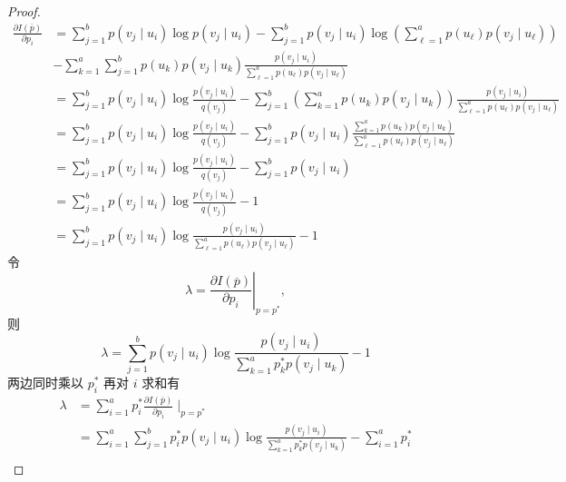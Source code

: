\begin{proof}
$$ \begin{aligned} \frac{\partial I(\bar{p})}{\partial p_{i}}&= \sum_{j=1}^{b} p\left(v_{j} \mid u_{i}\right) \log p\left(v_{j} \mid u_{i}\right)-\sum_{j=1}^{b} p\left(v_{j} \mid u_{i}\right) \log \left(\sum_{\ell=1}^{a} p\left(u_{\ell}\right) p\left(v_{j} \mid u_{\ell}\right)\right) \\ &-\sum_{k=1}^{a} \sum_{j=1}^{b} p\left(u_{k}\right) p\left(v_{j} \mid u_{k}\right) \frac{p\left(v_{j} \mid u_{i}\right)}{\sum\limits_{\ell=1}^{a} p\left(u_{\ell}\right) p\left(v_{j} \mid u_{\ell}\right)} \\ &=\sum_{j=1}^{b} p\left(v_{j} \mid u_{i}\right) \log \frac{p\left(v_{j} \mid u_{i}\right)}{q\left(v_{j}\right)}-\sum_{j=1}^{b}\left(\sum_{k=1}^{a} p\left(u_{k}\right) p\left(v_{j} \mid u_{k}\right)\right) \frac{p\left(v_{j} \mid u_{i}\right)}{\sum\limits_{\ell=1}^{a} p\left(u_{\ell}\right) p\left(v_{j} \mid u_{\ell}\right)} \\ &=\sum_{j=1}^{b} p\left(v_{j} \mid u_{i}\right) \log \frac{p\left(v_{j} \mid u_{i}\right)}{q\left(v_{j}\right)}-\sum_{j=1}^{b} p\left(v_{j} \mid u_{i}\right) \frac{\sum\limits_{k=1}^{a} p\left(u_{k}\right) p\left(v_{j} \mid u_{k}\right)}{\sum\limits_{\ell=1}^{a} p\left(u_{\ell}\right) p\left(v_{j} \mid u_{\ell}\right)} \\ &=\sum_{j=1}^{b} p\left(v_{j} \mid u_{i}\right) \log \frac{p\left(v_{j} \mid u_{i}\right)}{q\left(v_{j}\right)}-\sum_{j=1}^{b} p\left(v_{j} \mid u_{i}\right) \\ &=\sum_{j=1}^{b} p\left(v_{j} \mid u_{i}\right) \log \frac{p\left(v_{j} \mid u_{i}\right)}{q\left(v_{j}\right)}-1\\
&=\sum_{j=1}^{b} p\left(v_{j} \mid u_{i}\right) \log \frac{p\left(v_{j} \mid u_{i}\right)}{\sum\limits_{\ell=1}^{a} p\left(u_{\ell}\right) p\left(v_{j} \mid u_{\ell}\right)}-1
\end{aligned} $$
令
$$
\lambda=\left.\frac{\partial I(\overline{p})}{\partial p_{i}}\right|_{p=p^{*}},
$$
则
$$
\lambda=\sum_{j=1}^{b} p\left(v_{j} \mid u_{i}\right) \log \frac{p\left(v_{j} \mid u_{i}\right)}{\sum\limits_{k=1}^{a} p_{k}^{*} p\left(v_{j} \mid u_{k}\right)}-1
$$
两边同时乘以 $ p_{i}^{*} $ 再对 $ i $ 求和有
$$
\begin{aligned}
\lambda & =\sum_{i=1}^{a} p_{i}^{*} \frac{\partial I(\overline{p})}{\partial p_{i}} \mid_{ p=p^{*}} \\
& =\sum_{i=1}^{a} \sum_{j=1}^{b} p_{i}^{*} p\left(v_{j} \mid u_{i}\right) \log \frac{p\left(v_{j} \mid u_{i}\right)}{\sum\limits_{k=1}^{a} p_{k}^{*} p\left(v_{j} \mid u_{k}\right)}-\sum_{i=1}^{a} p_{i}^{*} \\

\end{aligned}$$
\end{proof}
